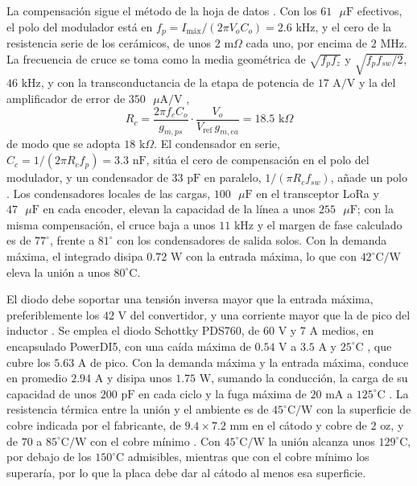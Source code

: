 \documentclass[../../General.tex]{subfiles}
\begin{document}
La compensación sigue el método de la hoja de datos \citep{ti_tps54540}. Con los $61\text{ }\mu\text{F}$ efectivos, el polo del modulador está en $f_p = I_{\text{máx}}/(2\pi V_o C_o) = 2.6\text{ kHz}$, y el cero de la resistencia serie de los cerámicos, de unos $2\text{ m}\Omega$ cada uno, por encima de $2\text{ MHz}$. La frecuencia de cruce se toma como la media geométrica de $\sqrt{f_p f_z}$ y $\sqrt{f_p f_{sw}/2}$, $46\text{ kHz}$, y con la transconductancia de la etapa de potencia de $17\text{ A/V}$ y la del amplificador de error de $350\text{ }\mu\text{A/V}$ \citep{ti_tps54540},
\begin{equation}
R_c = \frac{2\pi f_c C_o}{g_{m,ps}} \cdot \frac{V_o}{V_{\text{ref}}\, g_{m,ea}} = 18.5\text{ k}\Omega
\end{equation}
de modo que se adopta $18\text{ k}\Omega$. El condensador en serie, $C_c = 1/(2\pi R_c f_p) = 3.3\text{ nF}$, sitúa el cero de compensación en el polo del modulador, y un condensador de $33\text{ pF}$ en paralelo, $1/(\pi R_c f_{sw})$, añade un polo \citep{ti_tps54540}. Los condensadores locales de las cargas, $100\text{ }\mu\text{F}$ en el transceptor LoRa y $47\text{ }\mu\text{F}$ en cada encoder, elevan la capacidad de la línea a unos $255\text{ }\mu\text{F}$; con la misma compensación, el cruce baja a unos $11\text{ kHz}$ y el margen de fase calculado es de $77^\circ$, frente a $81^\circ$ con los condensadores de salida solos. Con la demanda máxima, el integrado disipa $0.72\text{ W}$ con la entrada máxima, lo que con $42^\circ\text{C/W}$ \citep{ti_tps54540} eleva la unión a unos $80^\circ\text{C}$.

El diodo debe soportar una tensión inversa mayor que la entrada máxima, preferiblemente los $42\text{ V}$ del convertidor, y una corriente mayor que la de pico del inductor \citep{ti_tps54540}. Se emplea el diodo Schottky PDS760, de $60\text{ V}$ y $7\text{ A}$ medios, en encapsulado PowerDI5, con una caída máxima de $0.54\text{ V}$ a $3.5\text{ A}$ y $25^\circ\text{C}$ \citep{diodes_pds760}, que cubre los $5.63\text{ A}$ de pico. Con la demanda máxima y la entrada máxima, conduce en promedio $2.94\text{ A}$ y disipa unos $1.75\text{ W}$, sumando la conducción, la carga de su capacidad de unos $200\text{ pF}$ en cada ciclo \citep{ti_tps54540,diodes_pds760} y la fuga máxima de $20\text{ mA}$ a $125^\circ\text{C}$ \citep{diodes_pds760}. La resistencia térmica entre la unión y el ambiente es de $45^\circ\text{C/W}$ con la superficie de cobre indicada por el fabricante, de $9.4 \times 7.2\text{ mm}$ en el cátodo y cobre de $2\text{ oz}$, y de $70$ a $85^\circ\text{C/W}$ con el cobre mínimo \citep{diodes_pds760}. Con $45^\circ\text{C/W}$ la unión alcanza unos $129^\circ\text{C}$, por debajo de los $150^\circ\text{C}$ admisibles, mientras que con el cobre mínimo los superaría, por lo que la placa debe dar al cátodo al menos esa superficie.
\end{document}
